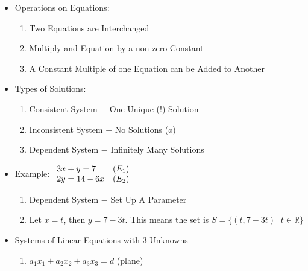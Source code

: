 \documentclass[12pt]{article}
\begin{document}
\begin{itemize}
\begin{enumerate}
    \end{enumerate}

  \item Operations on Equations:

    \begin{enumerate}

      \item Two Equations are Interchanged

      \item Multiply and Equation by a non-zero Constant

      \item A Constant Multiple of one Equation can be Added to Another

    \end{enumerate}

  \item Types of Solutions:

    \begin{enumerate}

      \item Consistent System $-$ One Unique (!) Solution

      \item Inconsistent System $-$ No Solutions (\o)

      \item Dependent System $-$ Infinitely Many Solutions

    \end{enumerate}

  \item Example: $\begin{array}{l l} 3x+y=7 & (E_1) \\ 2y=14-6x & (E_2)  \end{array}$

    \begin{enumerate}

      \item Dependent System $-$ Set Up A Parameter

      \item Let $x=t$, then $y=7-3t$. This means the set is $S=\{(t,7-3t)\,|\,t\in\mathbb{R}\}$

    \end{enumerate}

  \item Systems of Linear Equations with 3 Unknowns

    \begin{enumerate}

      \item $a_1x_1 + a_2x_2 + a_3x_3 =d$ (plane)


\end{enumerate}
\end{itemize}
\end{document}
